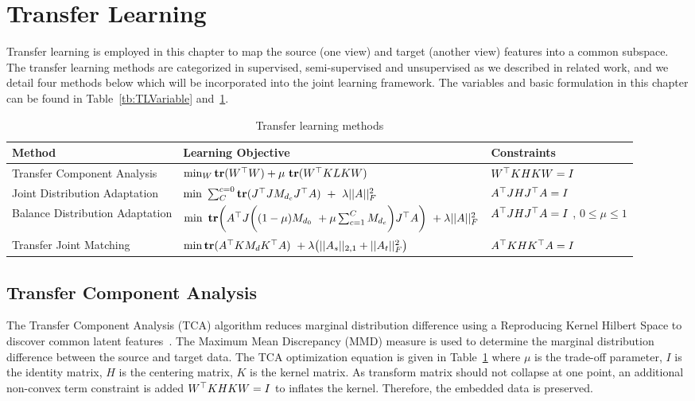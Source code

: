 \section{Transfer Learning}
Transfer learning is employed in this chapter to map the source (one view) and target (another view) features into a common subspace. The transfer learning methods are categorized in supervised, semi-supervised and unsupervised as we described in related work, and we detail four methods below which will be incorporated into the joint learning framework. The variables and  basic formulation in this chapter can be found in Table~\ref{tb:TLVariable} and~\ref{table:tcl}.
\begin{table}[hbt!]
	\footnotesize
	\centering
	\caption{Transfer learning methods} 
		\begin{tabular}{|m{2cm}|m{9cm}|m{2.9cm}|}
			\hline   
			Method & Learning Objective & Constraints  \\ 
			\hline
			Transfer Component Analysis&  $\min_W \textbf{tr}(W^\top W) + \mu \ \textbf{tr}(W^\top KLKW)$ &$W^\top KHKW = I$\\ \hline
			Joint Distribution Adaptation&$\min\ \sum_{C}^{c=0} \textbf{tr}(J^\T JM_{d_c}J^\T A) \ + \ \lambda ||A||_F^2 $ & $A^\top JHJ^\top A= I$           \\ \hline
			Balance Distribution Adaptation&  $\min \  \textbf{tr} \bigg(A^\top J \bigg((1-\mu )M_{d_0} \ + \mu \sum_{c=1}^{C}M_{d_c}\bigg)J^\top A \bigg)\ +\lambda||A||_F^2$&$A^\top JHJ^\top A= I$ , $0\leq \mu \leq 1$         \\ \hline
			Transfer Joint Matching & $\min \textbf{tr}(A^\top KM_dK^\top A)\ +\lambda \big(||A_s||_{2,1} + ||A_t||_F^2 \big)$ &$A^\top KHK^\top A= I $           \\  \hline
		\end{tabular}%
	\label{table:tcl}
\end{table}

\subsection{Transfer Component Analysis}
The Transfer Component Analysis (TCA) algorithm reduces marginal distribution difference using a Reproducing Kernel Hilbert Space to discover common latent features~\cite{pan2011domain,8258419}. The Maximum Mean Discrepancy (MMD) measure is used to determine the marginal distribution difference between the source and target data. The TCA optimization equation is given in Table~\ref{table:tcl} where $\mu$ is the trade-off parameter, $I$ is the identity matrix, $H$ is the centering matrix, $K$ is the kernel matrix. As transform matrix should not collapse at one point, an additional non-convex term constraint is added $W^\top KHKW = I$ to inflates the kernel. Therefore, the embedded data is preserved.

